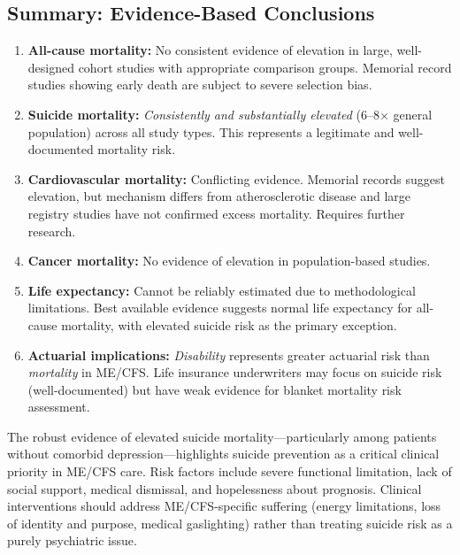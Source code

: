 \subsection{Summary: Evidence-Based Conclusions}
\label{subsec:mortality-summary}

\begin{enumerate}
    \item \textbf{All-cause mortality:} No consistent evidence of elevation in large, well-designed cohort studies with appropriate comparison groups. Memorial record studies showing early death are subject to severe selection bias.

    \item \textbf{Suicide mortality:} \textit{Consistently and substantially elevated} (6--8$\times$ general population) across all study types. This represents a legitimate and well-documented mortality risk.

    \item \textbf{Cardiovascular mortality:} Conflicting evidence. Memorial records suggest elevation, but mechanism differs from atherosclerotic disease and large registry studies have not confirmed excess mortality. Requires further research.

    \item \textbf{Cancer mortality:} No evidence of elevation in population-based studies.

    \item \textbf{Life expectancy:} Cannot be reliably estimated due to methodological limitations. Best available evidence suggests normal life expectancy for all-cause mortality, with elevated suicide risk as the primary exception.

    \item \textbf{Actuarial implications:} \textit{Disability} represents greater actuarial risk than \textit{mortality} in ME/CFS. Life insurance underwriters may focus on suicide risk (well-documented) but have weak evidence for blanket mortality risk assessment.
\end{enumerate}

\begin{observation}
The robust evidence of elevated suicide mortality---particularly among patients without comorbid depression---highlights suicide prevention as a critical clinical priority in ME/CFS care. Risk factors include severe functional limitation, lack of social support, medical dismissal, and hopelessness about prognosis. Clinical interventions should address ME/CFS-specific suffering (energy limitations, loss of identity and purpose, medical gaslighting) rather than treating suicide risk as a purely psychiatric issue.
\end{observation}


